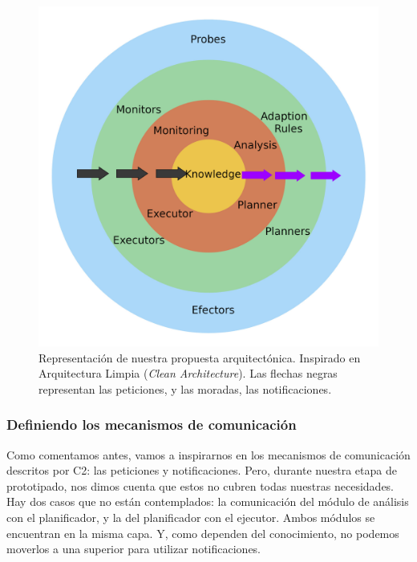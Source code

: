 \begin{figure}[htb]
  \centering
  \includegraphics[scale=0.45]{03_arquitectura/images/clean-arch-2-MAPEK-style-small}
  \caption[Representación de nuestra propuesta arquitectónica. Inspirado en Arquitectura Limpia (\emph{Clean Architecture}). Las flechas negras representan las peticiones, y las moradas, las notificaciones.]{Representación de nuestra propuesta arquitectónica. Inspirado en Arquitectura Limpia (\emph{Clean Architecture}). Las flechas negras representan las peticiones, y las moradas, las notificaciones. \footnotemark }
  \label{fig:clean-mapek-architecture}
\end{figure}


\subsubsection{Definiendo los mecanismos de comunicación}

Como comentamos antes, vamos a inspirarnos en los mecanismos de comunicación descritos por C2: las peticiones y notificaciones. Pero, durante nuestra etapa de prototipado, nos dimos cuenta que estos no cubren todas nuestras necesidades. Hay dos casos que no están contemplados: la comunicación del módulo de análisis con el planificador, y la del planificador con el ejecutor. Ambos módulos se encuentran en la misma capa. Y, como dependen del conocimiento, no podemos moverlos a una superior para utilizar notificaciones.

